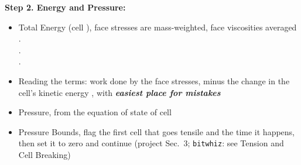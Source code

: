 \documentclass[11pt,addpoints]{exam}
\begin{document}
\begin{tcolorbox}[breakable]
\textbf{Step 2. Energy and Pressure:}\vspace{.5em}
\begin{itemize}
\item Total Energy (cell ), \hspace{3mm} face stresses are mass-weighted, face viscosities averaged\vspace{.5em}\\
.~~~~\vspace{1em}\\
.~~~~~~~~~~~~~~~~\vspace{1em}\\
.~~~~~~~~~~~~~~~~\vspace{1em}
\item Reading the terms: work done by the face stresses, minus the change in the cell's kinetic energy , with  \hspace{2mm} \textbf{\emph{easiest place for mistakes}}\vspace{.5em}
\item Pressure, \hspace{3mm}  \hspace{7mm} from the equation of state of cell \vspace{.5em}
\item Pressure Bounds, \hspace{3mm}  \hspace{5mm} flag the first cell that goes tensile and the time it happens, then set it to zero and continue (project Sec.~3; \texttt{bitwhiz}: see Tension and Cell Breaking)
\end{itemize}
\end{tcolorbox}

\clearpage
\end{document}
